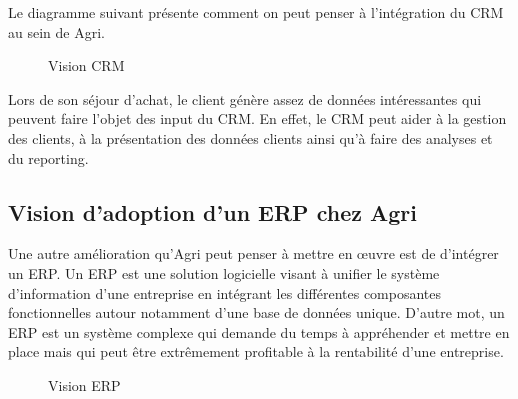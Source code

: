 \documentclass[a4paper]{report}
\begin{document}
\begin{doublespace}
Le diagramme suivant présente comment on peut penser à l'intégration du
CRM au sein de Agri.

\begin{figure}[H] 
	\begin{center}
		\caption{Vision CRM}
	\end{center}
\end{figure}

Lors de son séjour d'achat, le client génère assez de données intéressantes qui peuvent faire l'objet des input du CRM. En effet, le CRM peut aider à la gestion des clients, à la présentation des données clients ainsi qu'à faire des analyses et du reporting.

\subsection{Vision d'adoption d'un ERP chez Agri}

Une autre amélioration qu'Agri peut penser à mettre en œuvre est de
d'intégrer un ERP. Un ERP est une solution logicielle visant à unifier
le système d'information d'une entreprise en intégrant les différentes
composantes fonctionnelles autour notamment d'une base de données
unique. D'autre mot, un ERP est un système complexe qui demande du temps
à appréhender et mettre en place mais qui peut être extrêmement
profitable à la rentabilité d'une entreprise.

\begin{figure}[H] 
	\begin{center}
		\caption{Vision ERP}
	\end{center}
\end{figure}


\end{doublespace}
\end{document}
